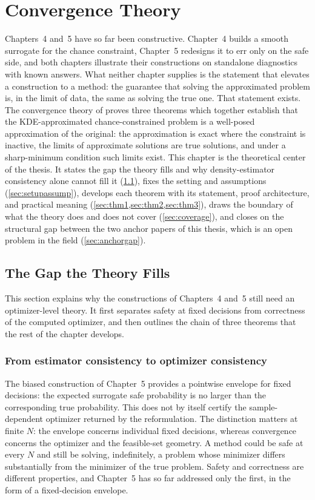 \section{Convergence Theory}
\label{ch:convergence}

Chapters~4 and~5 have so far been constructive. Chapter~4 builds a smooth surrogate
for the chance constraint, Chapter~5 redesigns it to err only on the
safe side, and both chapters illustrate their constructions on standalone
diagnostics with known answers. What neither chapter supplies
is the statement that elevates a construction to a method: the guarantee
that solving the approximated problem is, in the limit of data, the same
as solving the true one. That statement exists. The convergence theory
of \citet{schuster2025} proves three theorems which together establish
that the KDE-approximated chance-constrained problem is a well-posed
approximation of the original: the approximation is exact where the
constraint is inactive, the limits of approximate solutions are true
solutions, and under a sharp-minimum condition such limits exist. This
chapter is the theoretical center of the thesis. It states the gap the
theory fills and why density-estimator consistency alone cannot fill it
(\cref{sec:gap}), fixes the setting and assumptions
(\cref{sec:setupassump}), develops each theorem with its statement,
proof architecture, and practical meaning
(\cref{sec:thm1,sec:thm2,sec:thm3}), draws the boundary of what the
theory does and does not cover (\cref{sec:coverage}), and closes on the
structural gap between the two anchor papers of this thesis, which is
an open problem in the field
(\cref{sec:anchorgap}).

\subsection{The Gap the Theory Fills}
\label{sec:gap}

This section explains why the constructions of Chapters~4 and~5 still
need an optimizer-level theory. It first separates safety at fixed
decisions from correctness of the computed optimizer, and then outlines
the chain of three theorems that the rest of the chapter develops.

\subsubsection{From estimator consistency to optimizer consistency}
\label{sec:estimatoroptimizergap}

The biased construction of Chapter~5 provides a pointwise envelope for
fixed decisions: the expected surrogate safe probability is no larger than
the corresponding true probability. This does not by itself certify the
sample-dependent optimizer returned by the reformulation. The distinction
matters at finite $N$: the envelope concerns individual fixed decisions,
whereas convergence concerns the optimizer and the feasible-set geometry.
A method could be safe at every $N$ and still be solving, indefinitely,
a problem whose minimizer differs substantially from the minimizer of
the true problem. Safety and correctness are different properties, and
Chapter~5 has so far addressed only the first, in the form of a
fixed-decision envelope.


